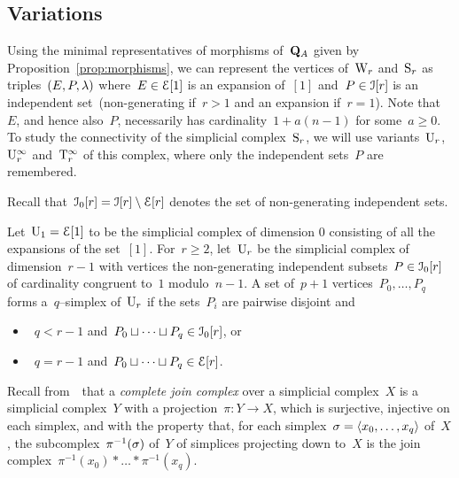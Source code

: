 \subsection{Variations}

Using the minimal
representatives of morphisms of~$\mathbf{Q}_A$ given by Proposition~\ref{prop:morphisms}, we can represent the vertices of~$\mathrm{W}_r$ and~$\mathrm{S}_r$ as triples~$(E,P,\lambda)$ where~$E\in \mathcal{E}[1]$ is an expansion of~$[1]$ and~$P\in \mathcal{I}[r]$ is  an independent set~(non-generating if~$r>1$ and an expansion if~$r=1$). 
Note that~$E$, and hence also~$P$, necessarily has cardinality~\hbox{$1+a(n-1)$} for some~$a\ge 0$. 
To study the connectivity of the simplicial complex~$\mathrm{S}_r$, we will use variants~$\mathrm{U}_r$,~$\mathrm{U}_r^{\infty}$ and~$\mathrm{T}_r^\infty$ of this complex, where only the independent sets~$P$ are remembered. 

Recall that~$\mathcal{I}_0[r]=\mathcal{I}[r]\setminus \mathcal{E}[r]$ denotes the set of non-generating independent sets. 

\begin{definition}\label{def:US}
Let~$\mathrm{U}_1=\mathcal{E}[1]$ to be the simplicial complex of dimension 0 consisting of all the expansions of the set~$[1]$. 
For~$r\geqslant2$, let~$\mathrm{U}_r$ be the simplicial complex of dimension~\hbox{$r-1$} 
with vertices the non-generating independent subsets~$P\in \mathcal{I}_0[r]$ of cardinality congruent to~$1$ modulo~$n-1$. A set of~\hbox{$p+1$} vertices~$P_0,\dots,P_q$ forms a~$q$--simplex of~$\mathrm{U}_r$ if the sets~$P_i$ are pairwise disjoint and 
\begin{itemize}[noitemsep,topsep=0pt]
\item~$q<r-1$ and~$P_0\sqcup\dots\sqcup P_q\in \mathcal{I}_0[r]$, or
\item~$q=r-1$ and~$P_0\sqcup\dots\sqcup P_q\in\mathcal{E}[r]$.
\end{itemize} 
\end{definition}


Recall from~\, that a {\em complete join complex} over a simplicial complex~$X$ is a simplicial complex~$Y$ with a projection~$\pi\colon  Y\to X$, which is surjective, injective on each simplex, and with the property that, for each simplex~$\sigma=\langle x_0,\dots,x_q\rangle$ of~$X$, the subcomplex~$\pi^{-1}(\sigma)$ of~$Y$ of simplices projecting down to~$X$ is the join complex~$\pi^{-1}(x_0)*\dots*\pi^{-1}(x_q)$. 

